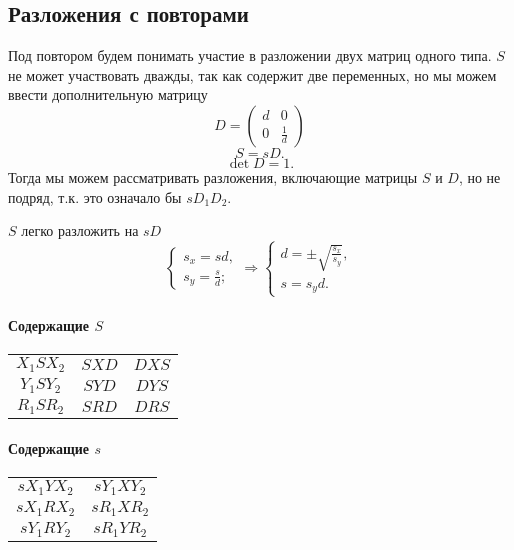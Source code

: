 \subsection{Разложения с повторами}

Под повтором будем понимать участие в разложении двух матриц одного типа.
$S$ не может участвовать дважды, так как содержит две переменных, но мы можем ввести дополнительную матрицу
$$D = \begin{pmatrix}
	d & 0\\
	0 & \frac{1}{d}
\end{pmatrix}$$
$$S = sD.$$
$$\det D = 1.$$
Тогда мы можем рассматривать разложения, включающие матрицы $S$ и $D$, но не подряд, т.к. это означало бы $sD_1D_2$.

$S$ легко разложить на $sD$
$$\begin{cases}
	s_x = sd,\\
	s_y = \frac{s}{d};
\end{cases}
\Rightarrow
\begin{cases}
	d = \pm \sqrt{\frac{s_x}{s_y}},\\
	s = s_y d.
\end{cases}
$$


\paragraph{Содержащие $S$}

\begin{tabular}{|c|c|c|}
\hline
$X_1SX_2$ & $SXD$ & $DXS$ \\
$Y_1SY_2$ & $SYD$ & $DYS$ \\
$R_1SR_2$ & $SRD$ & $DRS$ \\
\hline
\end{tabular}

\paragraph{Содержащие $s$}

\begin{tabular}{|c|c|}
\hline
$sX_1YX_2$ & $sY_1XY_2$ \\
$sX_1RX_2$ & $sR_1XR_2$ \\
$sY_1RY_2$ & $sR_1YR_2$ \\
\hline
\end{tabular}
